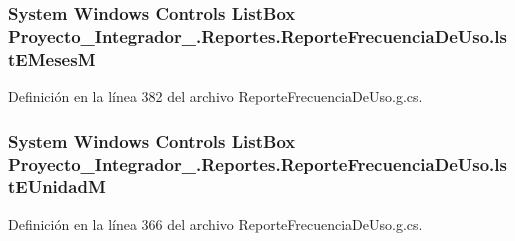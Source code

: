 \hypertarget{class_proyecto___integrador__3_1_1_reportes_1_1_reporte_frecuencia_de_uso_a5adb40758c162bfdc84fd55c49440e4e}{
\subsubsection[{lst\-E\-Meses\-M}]{\setlength{\rightskip}{0pt plus 5cm}System Windows Controls List\-Box Proyecto\-\_\-\-Integrador\-\_.\-Reportes.\-Reporte\-Frecuencia\-De\-Uso.\-lst\-E\-Meses\-M\hspace{0.3cm}{\ttfamily [package]}}}\label{class_proyecto___integrador__3_1_1_reportes_1_1_reporte_frecuencia_de_uso_a5adb40758c162bfdc84fd55c49440e4e}


Definición en la línea 382 del archivo Reporte\-Frecuencia\-De\-Uso.\-g.\-cs.

\hypertarget{class_proyecto___integrador__3_1_1_reportes_1_1_reporte_frecuencia_de_uso_a061126bfb2b2fa1c828210ef06f6c495}{
\subsubsection[{lst\-E\-Unidad\-M}]{\setlength{\rightskip}{0pt plus 5cm}System Windows Controls List\-Box Proyecto\-\_\-\-Integrador\-\_.\-Reportes.\-Reporte\-Frecuencia\-De\-Uso.\-lst\-E\-Unidad\-M\hspace{0.3cm}{\ttfamily [package]}}}\label{class_proyecto___integrador__3_1_1_reportes_1_1_reporte_frecuencia_de_uso_a061126bfb2b2fa1c828210ef06f6c495}


Definición en la línea 366 del archivo Reporte\-Frecuencia\-De\-Uso.\-g.\-cs.

